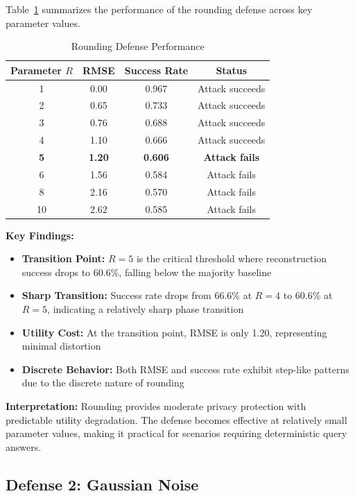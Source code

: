 \documentclass[11pt,letterpaper]{article}
\begin{document}
Table~\ref{tab:rounding} summarizes the performance of the rounding defense across key parameter values.

\begin{table}[H]
\centering
\caption{Rounding Defense Performance}
\label{tab:rounding}
\begin{tabular}{@{}cccc@{}}
\toprule
\textbf{Parameter $R$} & \textbf{RMSE} & \textbf{Success Rate} & \textbf{Status} \\ \midrule
1 & 0.00 & 0.967 & Attack succeeds \\
2 & 0.65 & 0.733 & Attack succeeds \\
3 & 0.76 & 0.688 & Attack succeeds \\
4 & 1.10 & 0.666 & Attack succeeds \\
\textbf{5} & \textbf{1.20} & \textbf{0.606} & \textbf{Attack fails} \\
6 & 1.56 & 0.584 & Attack fails \\
8 & 2.16 & 0.570 & Attack fails \\
10 & 2.62 & 0.585 & Attack fails \\ \bottomrule
\end{tabular}
\end{table}

\textbf{Key Findings:}

\begin{itemize}[leftmargin=*]
    \item \textbf{Transition Point:} $R = 5$ is the critical threshold where reconstruction success drops to 60.6\%, falling below the majority baseline
    \item \textbf{Sharp Transition:} Success rate drops from 66.6\% at $R=4$ to 60.6\% at $R=5$, indicating a relatively sharp phase transition
    \item \textbf{Utility Cost:} At the transition point, RMSE is only 1.20, representing minimal distortion
    \item \textbf{Discrete Behavior:} Both RMSE and success rate exhibit step-like patterns due to the discrete nature of rounding
\end{itemize}

\textbf{Interpretation:} Rounding provides moderate privacy protection with predictable utility degradation. The defense becomes effective at relatively small parameter values, making it practical for scenarios requiring deterministic query answers.

\subsection{Defense 2: Gaussian Noise}
\end{document}
